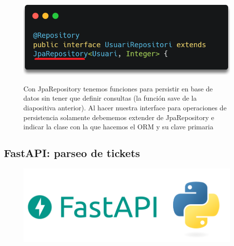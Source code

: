 \documentclass{beamer}
\begin{document}
	
		\begin{frame}
		\begin{figure}
			\centering
			\includegraphics[width=1\linewidth]{imgEspecifiques/JPAexplicacioSaveRepoUsuari.png}
			\label{fig:JPAexplicacioSaveRepoUsuari}
			\caption{Con JpaRepository tenemos funciones para persistir en base de datos sin tener que definir consultas (la función save de la diapositiva anterior). Al hacer nuestra interface para operaciones de persistencia solamente debememos extender de JpaRepository e indicar la clase con la que hacemos el ORM y su clave primaria}
		\end{figure}
	\end{frame}
	
	
	
	
	\subsection{FastAPI: parseo de tickets}
	
	


		\begin{frame}
				
			\begin{figure}
				\centering
				\includegraphics[width=1\linewidth]{imgEspecifiques/fastAPIiPythonLogos}
				\label{fig:fastapiipythonlogos}
			\end{figure}
			
		\end{frame}
\end{document}
